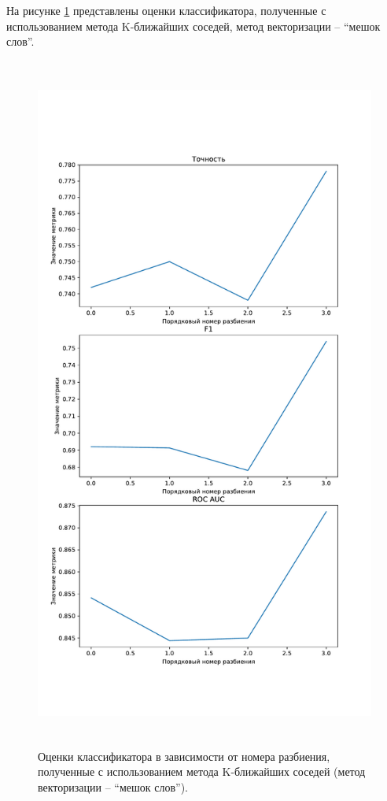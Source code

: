 На рисунке \ref{img:knnMetricsBag} представлены оценки классификатора, полученные с использованием метода K-ближайших соседей, метод векторизации -- ``мешок слов''.
\begin{figure}[H]
	\centering
	\includegraphics[height=23cm]{inc/plots/knnMetricsBag.pdf}
	\caption{ Оценки классификатора в зависимости от номера разбиения, полученные с использованием метода K-ближайших соседей (метод векторизации --  ``мешок слов''). }
	\label{img:knnMetricsBag}
\end{figure}


